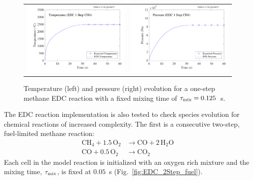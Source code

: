 \documentclass[11pt]{book}
\begin{document}
\begin{figure}[h!]
\begin{tabular*}{\textwidth}{lr}
\includegraphics[width=3.2in]{SCRIPT_FIGURES/reactionrate_EDC_1step_nonmix_temp} &
\includegraphics[width=3.2in]{SCRIPT_FIGURES/reactionrate_EDC_1step_nonmix_pres}
\end{tabular*}
\caption[Temperature and pressure evolution in a 1-step Methane EDC reaction]{Temperature (left) and pressure (right) evolution for a one-step methane EDC reaction with a fixed mixing time of $\tau_{\rm mix}=0.125$~s.}
\label{fig:EDC_meth_non_temppres}
\end{figure}

The EDC reaction implementation is also tested to check species evolution for chemical reactions of increased complexity. The first is a consecutive two-step, fuel-limited methane reaction:
\begin{align}\label{eq:2step_methane}
\mathrm{CH_4 + 1.5 \, O_2} &\rightarrow  \mathrm{CO + 2 \, H_2O} \\
\nonumber \mathrm{CO + 0.5 \, O_2} &\rightarrow \mathrm{CO_2}
\end{align}
Each cell in the model reaction is initialized with an oxygen rich mixture and the mixing time, $\tau_{\rm mix}$, is fixed at $0.05$~s (Fig.~\ref{fig:EDC_2Step_fuel}).
\end{document}
